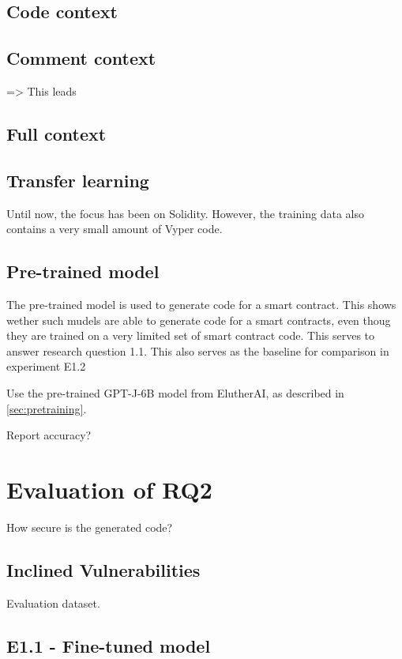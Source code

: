 \subsection{Code context}
\subsection{Comment context}
=> This leads

\subsection{Full context}

\subsection{Transfer learning}
Until now, the focus has been on Solidity. However, the training data also contains a very small amount of Vyper code. 

\subsection{Pre-trained model}
\label{sec:eval-pre-trained-model}
The pre-trained model is used to generate code for a smart contract. This shows wether such mudels are able to generate code for a smart contracts, even thoug they are trained on a very limited set of smart contract code. This serves to answer research  question 1.1. This also serves as the baseline for comparison in experiment E1.2

Use the pre-trained GPT-J-6B model from ElutherAI, as described in \cref{sec:pretraining}.

Report accuracy?


\section{Evaluation of RQ2}
How secure is the generated code?

\subsection{Inclined Vulnerabilities}
\label{sec:inclined-vulnerabilities}

Evaluation dataset.


\subsection{E1.1 - Fine-tuned model}
\label{sec:e2.1-fine-tuned-model}

